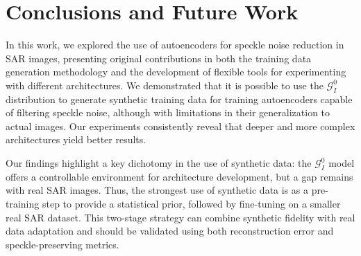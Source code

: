 \section{Conclusions and Future Work}
\label{chap:conclusions}

In this work, we explored the use of autoencoders for speckle noise reduction in SAR images, presenting original contributions in both the training data generation methodology and the development of flexible tools for experimenting with different architectures. We demonstrated that it is possible to use the $\mathcal{G}_I^0$ distribution to generate synthetic training data for training autoencoders capable of filtering speckle noise, although with limitations in their generalization to actual images. Our experiments consistently reveal that deeper and more complex architectures yield better results. %

Our findings highlight a key dichotomy in the use of synthetic data: the $\mathcal{G}_I^0$ model offers a controllable environment for architecture development, but a gap remains with real SAR images. Thus, the strongest use of synthetic data is as a pre-training step to provide a statistical prior, followed by fine-tuning on a smaller real SAR dataset. This two-stage strategy can combine synthetic fidelity with real data adaptation and should be validated using both reconstruction error and speckle-preserving metrics.

